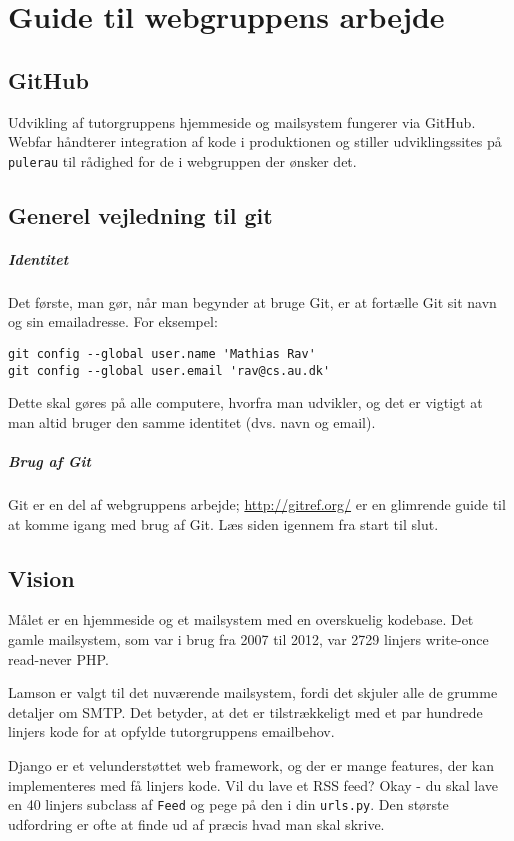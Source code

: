 \documentclass[article,oneside,a4paper]{memoir}
\newcommand{\pulerau}{\texttt{pulerau}\xspace}
\begin{document}
\chapter{Guide til webgruppens arbejde}

\section{GitHub}

Udvikling af tutorgruppens hjemmeside og mailsystem fungerer via GitHub. Webfar
håndterer integration af kode i produktionen og stiller udviklingssites på
\pulerau til rådighed for de i webgruppen der ønsker det.

\section{Generel vejledning til git}

\paragraph{Identitet}
Det første, man gør, når man begynder at bruge Git, er at fortælle Git sit navn
og sin emailadresse. For eksempel:
\begin{lstlisting}
git config --global user.name 'Mathias Rav'
git config --global user.email 'rav@cs.au.dk'
\end{lstlisting}
Dette skal gøres på alle computere, hvorfra man udvikler, og det er vigtigt at
man altid bruger den samme identitet (dvs. navn og email).

\paragraph{Brug af Git}
Git er en del af webgruppens arbejde; \url{http://gitref.org/} er en glimrende
guide til at komme igang med brug af Git. Læs siden igennem fra start til slut.

\section{Vision}

Målet er en hjemmeside og et mailsystem med en overskuelig kodebase.
Det gamle mailsystem, som var i brug fra 2007 til 2012, var 2729 linjers
write-once read-never PHP.

Lamson er valgt til det nuværende mailsystem, fordi det skjuler alle de grumme
detaljer om SMTP.  Det betyder, at det er tilstrækkeligt med et par hundrede
linjers kode for at opfylde tutorgruppens emailbehov.

Django er et velunderstøttet web framework, og der er mange features, der kan
implementeres med få linjers kode. Vil du lave et RSS feed? Okay - du skal lave
en 40 linjers subclass af \texttt{Feed} og pege på den i din \texttt{urls.py}.
Den største udfordring er ofte at finde ud af præcis hvad man skal skrive.
\end{document}
